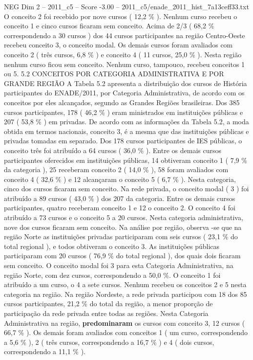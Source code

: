 \begin{textsample}{NEG Dim 2 – 2011\_c5 – Score -3.00 – 2011\_c5/enade\_2011\_hist\_7a13ceff33.txt}
O conceito 2 foi recebido por nove cursos ( 12,2 \% ).
Nenhum curso recebeu o conceito 1 e cinco cursos ficaram sem conceito.
Acima de 2/3 ( 68,2 \% correspondendo a 30 cursos ) dos 44 cursos participantes na região Centro-Oeste recebeu conceito 3, o conceito modal.
Os demais cursos foram avaliados com conceito 2 ( três cursos, 6,8 \% ) e conceito 4 ( 11 cursos, 25,0 \% ).
Nesta região nenhum curso ficou sem conceito.
Nenhum curso, tampouco, recebeu conceitos 1 ou 5. 5.2 CONCEITOS POR CATEGORIA ADMINISTRATIVA E POR GRANDE REGIÃO A Tabela 5.2 apresenta a distribuição dos cursos de História participantes do ENADE/2011, por Categoria Administrativa, de acordo com os conceitos por eles alcançados, segundo as Grandes Regiões brasileiras.
Dos 385 cursos participantes, 178 ( 46,2 \% ) eram ministrados em instituições públicas e 207 ( 53,8 \% ) em privadas.
De acordo com as informações da Tabela 5.2, a moda obtida em termos nacionais, conceito 3, é a mesma que das instituições públicas e privadas tomadas em separado.
Dos 178 cursos participantes de IES públicas, o conceito três foi atribuído a 64 cursos ( 36,0 \% ).
Entre os demais cursos participantes oferecidos em instituições públicas, 14 obtiveram conceito 1 ( 7,9 \% da categoria ), 25 receberam conceito 2 ( 14,0 \% ), 58 foram avaliados com conceito 4 ( 32,6 \% ) e 12 alcançaram o conceito 5 ( 6,7 \% ).
Nesta categoria, cinco dos cursos ficaram sem conceito.
Na rede privada, o conceito modal ( 3 ) foi atribuído a 89 cursos ( 43,0 \% ) dos 207 da categoria.
Entre os demais cursos participantes, quatro receberam conceito 1 e 12 o conceito 2.
O conceito 4 foi atribuído a 73 cursos e o conceito 5 a 20 cursos.
Nesta categoria administrativa, nove dos cursos ficaram sem conceito.
Na análise por região, observa -se que na região Norte as instituições privadas participaram com seis cursos ( 23,1 \% do total regional ), e todos obtiveram o conceito 3.
As instituições públicas participaram com 20 cursos ( 76,9 \% do total regional ), dos quais dois ficaram sem conceito.
O conceito modal foi 3 para esta Categoria Administrativa, na região Norte, com dez cursos, correspondendo a 50,0 \%.
O conceito 1 foi atribuído a um curso, o 4 a sete cursos.
Nenhum recebeu os conceitos 2 e 5 nesta categoria na região.
Na região Nordeste, a rede privada participou com 18 dos 85 cursos participantes, 21,2 \% do total da região, a menor proporção de participação da rede privada entre todas as regiões.
Nesta Categoria Administrativa na região, \textbf{predominaram} os cursos com conceito 3, 12 cursos ( 66,7 \% ).
Os demais foram avaliados com conceitos 1 ( um curso, correspondendo a 5,6 \% ), 2 ( três cursos, correspondendo a 16,7 \% ) e 4 ( dois cursos, correspondendo a 11,1 \% ).

\end{textsample}
